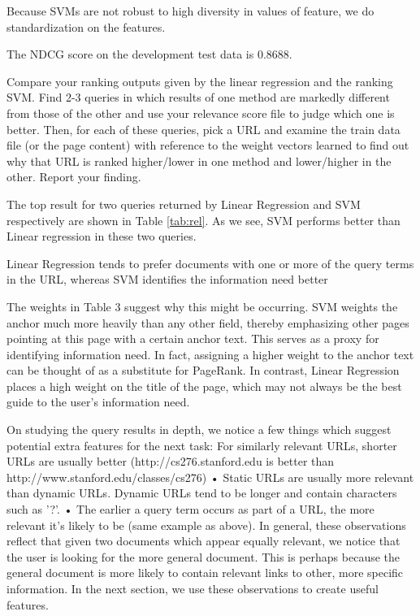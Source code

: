 Because SVMs are not robust to high diversity in values of feature,
we do standardization on the features.

The NDCG score on the development test data is $0.8688$.


Compare your ranking outputs given by the linear regression and the ranking SVM.
Find 2-3 queries in which results of one method are markedly different from those
of the other and use your relevance score file to judge which one is better.
Then, for each of these queries, pick a URL and examine the train data file (or the
page content) with reference to the weight vectors learned to find out why that
URL is ranked higher/lower in one method and lower/higher in the other. Report
your finding.

The top result for two queries returned by Linear Regression and SVM respectively are shown in Table \ref{tab:rel}. As we see, SVM performs better than Linear regression in these two queries.

Linear Regression tends to prefer documents with one or more of the
query terms in the URL, whereas SVM identifies the information need better

The weights in Table 3 suggest why this might be occurring. SVM weights the anchor much more
heavily than any other field, thereby emphasizing other pages pointing at this page with a certain
anchor text. This serves as a proxy for identifying information need. In fact, assigning a higher weight
to the anchor text can be thought of as a substitute for PageRank. In contrast, Linear Regression
places a high weight on the title of the page, which may not always be the best guide to the user’s
information need.

On studying the query results in depth, we notice a few things which suggest potential extra features
for the next task:
For similarly relevant URLs, shorter URLs are usually better (http://cs276.stanford.edu is
better than http://www.stanford.edu/classes/cs276)
• Static URLs are usually more relevant than dynamic URLs. Dynamic URLs tend to be longer
and contain characters such as ’?’.
• The earlier a query term occurs as part of a URL, the more relevant it’s likely to be (same
example as above).
In general, these observations reflect that given two documents which appear equally relevant, we
notice that the user is looking for the more general document. This is perhaps because the general
document is more likely to contain relevant links to other, more specific information. In the next
section, we use these observations to create useful features.



